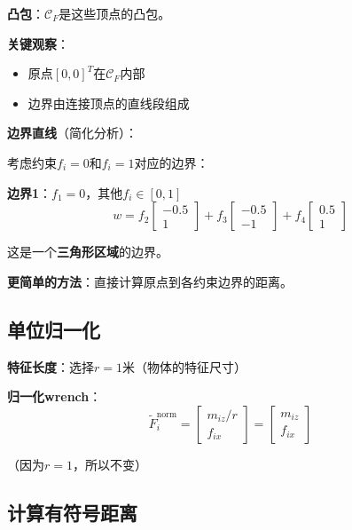 \documentclass[12pt,a4paper]{article}
\begin{document}
\textbf{凸包}：$\mathcal{C}_F$是这些顶点的凸包。

\textbf{关键观察}：
\begin{itemize}
\item 原点$[0, 0]^T$在$\mathcal{C}_F$内部
\item 边界由连接顶点的直线段组成
\end{itemize}

\textbf{边界直线}（简化分析）：

考虑约束$f_i = 0$和$f_i = 1$对应的边界：

\textbf{边界1}：$f_1 = 0$，其他$f_i \in [0,1]$
\begin{equation}
w = f_2 \begin{bmatrix} -0.5 \\ 1 \end{bmatrix} + f_3 \begin{bmatrix} -0.5 \\ -1 \end{bmatrix} + f_4 \begin{bmatrix} 0.5 \\ 1 \end{bmatrix}
\end{equation}

这是一个\textbf{三角形区域}的边界。

\textbf{更简单的方法}：直接计算原点到各约束边界的距离。

\subsection{单位归一化}

\textbf{特征长度}：选择$r = 1$米（物体的特征尺寸）

\textbf{归一化wrench}：
\begin{equation}
\tilde{F}_i^{\text{norm}} = \begin{bmatrix} m_{iz}/r \\ f_{ix} \end{bmatrix} = \begin{bmatrix} m_{iz} \\ f_{ix} \end{bmatrix}
\end{equation}

（因为$r = 1$，所以不变）

\subsection{计算有符号距离}
\end{document}
